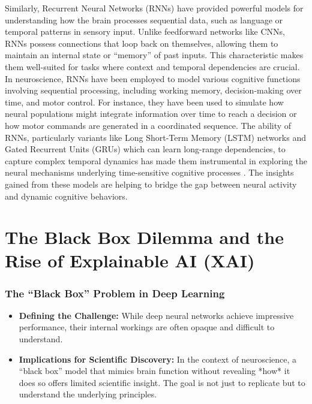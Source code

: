 \documentclass[11pt,a4paper]{article}
\begin{document}
Similarly, Recurrent Neural Networks (RNNs) have provided powerful models for understanding how the brain processes sequential data, such as language or temporal patterns in sensory input. Unlike feedforward networks like CNNs, RNNs possess connections that loop back on themselves, allowing them to maintain an internal state or ``memory'' of past inputs. This characteristic makes them well-suited for tasks where context and temporal dependencies are crucial. In neuroscience, RNNs have been employed to model various cognitive functions involving sequential processing, including working memory, decision-making over time, and motor control. For instance, they have been used to simulate how neural populations might integrate information over time to reach a decision or how motor commands are generated in a coordinated sequence. The ability of RNNs, particularly variants like Long Short-Term Memory (LSTM) networks and Gated Recurrent Units (GRUs) which can learn long-range dependencies, to capture complex temporal dynamics has made them instrumental in exploring the neural mechanisms underlying time-sensitive cognitive processes \cite{richards2019deep}. The insights gained from these models are helping to bridge the gap between neural activity and dynamic cognitive behaviors.

\clearpage

\part{The Black Box Dilemma and the Rise of Explainable AI (XAI)}

\section{The ``Black Box'' Problem in Deep Learning}
\begin{itemize}
    \item \textbf{Defining the Challenge:} While deep neural networks achieve impressive performance, their internal workings are often opaque and difficult to understand.
    \item \textbf{Implications for Scientific Discovery:} In the context of neuroscience, a ``black box'' model that mimics brain function without revealing *how* it does so offers limited scientific insight. The goal is not just to replicate but to understand the underlying principles.
\end{itemize}
\end{document}
